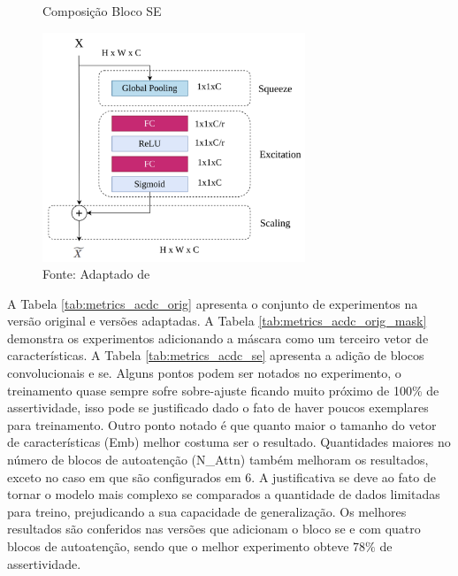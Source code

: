 \begin{figure}[h!]
    \centering
    \caption{Composição Bloco SE}
    \includegraphics[width=0.7\textwidth]{figures/fig031.png}
    \caption*{Fonte: Adaptado de \cite{lafraxoSEDARUnetSqueezeexcitationDilated2024}}
    \label{fig:fig031}
\end{figure}


A Tabela \ref{tab:metrics_acdc_orig} apresenta o conjunto de experimentos na versão original e versões adaptadas. A Tabela \ref{tab:metrics_acdc_orig_mask} demonstra os experimentos adicionando a máscara como um terceiro vetor de características. A Tabela \ref{tab:metrics_acdc_se} apresenta a adição de blocos convolucionais e  \gls{se}. Alguns pontos podem ser notados no experimento, o treinamento quase sempre sofre sobre-ajuste ficando muito próximo de 100\% de assertividade, isso pode se justificado dado o fato de haver poucos exemplares para treinamento. Outro ponto notado é que quanto maior o tamanho do vetor de características (Emb) melhor costuma ser o resultado. Quantidades maiores no número de blocos de autoatenção (N\_Attn) também melhoram os resultados, exceto no caso em que são configurados em $6$. A justificativa se deve ao fato de tornar o modelo mais complexo se comparados a quantidade de dados limitadas para treino, prejudicando a sua capacidade de generalização. Os melhores resultados são conferidos nas versões que adicionam o bloco \gls{se} e com quatro blocos de autoatenção, sendo que o melhor experimento obteve $78\%$ de assertividade.


